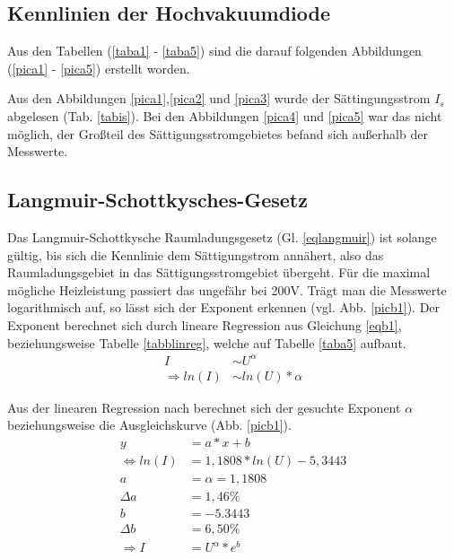 \subsection{Kennlinien der Hochvakuumdiode} 
Aus den Tabellen (\ref{taba1} - \ref{taba5}) sind die darauf folgenden 
Abbildungen (\ref{pica1} - \ref{pica5}) erstellt worden.
    
     
Aus den Abbildungen \ref{pica1},\ref{pica2} und \ref{pica3} wurde der Sättingungsstrom 
$I_s$ abgelesen (Tab. \ref{tabis}). Bei den Abbildungen \ref{pica4} und \ref{pica5} war das 
nicht möglich, der Großteil des Sättigungsstromgebietes befand sich außerhalb der 
Messwerte.

\FloatBarrier
\subsection{Langmuir-Schottkysches-Gesetz}
Das Langmuir-Schottkysche Raumladungsgesetz (Gl. \ref{eqlangmuir}) ist solange gültig, bis sich die Kennlinie
dem Sättigungstrom annähert, also das Raumladungsgebiet in das Sättigungsstromgebiet 
übergeht. Für die maximal mögliche Heizleistung passiert das ungefähr bei 200V.
Trägt man die Messwerte logarithmisch auf, so lässt sich der Exponent erkennen (vgl. 
Abb. \ref{picb1}). Der Exponent berechnet sich durch lineare Regression \cite{linreg}
aus Gleichung \ref{eqb1}, beziehungsweise Tabelle \ref{tabblinreg}, welche auf Tabelle \ref{taba5} aufbaut.
\begin{align}
I&\sim U^\alpha \\
\Rightarrow ln(I)&\sim ln(U)*\alpha \label{eqb1}
\end{align}

\FloatBarrier
Aus der linearen Regression nach \cite{linreg} berechnet sich der gesuchte Exponent $\alpha$ beziehungsweise die Ausgleichskurve (Abb. \ref{picb1}).
\begin{align}
y&=a*x+b \\
\Leftrightarrow ln(I)&=1,1808*ln(U)-5,3443 \\
a&=\alpha=1,1808 \label{exalpha}\\
\Delta a&=1,46\% \\
b&=-5.3443 \\
\Delta b&=6,50\% \\
\Rightarrow I&=U^\alpha*e^b 
\end{align}

\FloatBarrier
